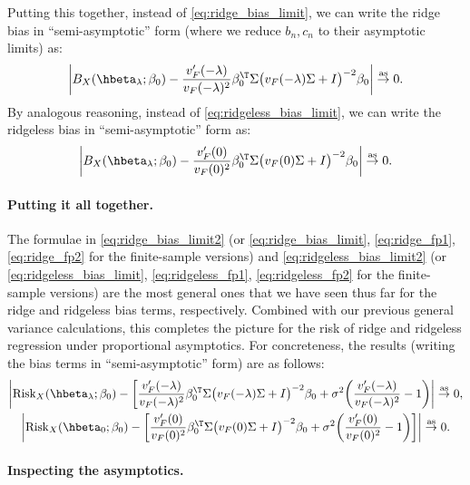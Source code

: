 \documentclass{article}
\begin{document}
Putting this together, instead of \eqref{eq:ridge_bias_limit}, we can write the 
ridge bias in ``semi-asymptotic'' form (where we reduce $b_n,c_n$ to their 
asymptotic limits) as:     
\begin{equation}
\label{eq:ridge_bias_limit2}
\bigg| B_X(\hbeta_\lambda; \beta_0) - \frac{v'_F(-\lambda)}{v_F(-\lambda)^2}
\beta_0^\T \Sigma \big( v_F(-\lambda) \Sigma + I \big)^{-2} \beta_0 \bigg| \asto
0.
\end{equation}
By analogous reasoning, instead of \eqref{eq:ridgeless_bias_limit}, we can write
the ridgeless bias in ``semi-asymptotic'' form as:
\begin{equation}
\label{eq:ridgeless_bias_limit2}
\bigg| B_X(\hbeta_\lambda; \beta_0) - \frac{v'_F(0)}{v_F(0)^2} \beta_0^\T
\Sigma \big( v_F(0) \Sigma + I \big)^{-2} \beta_0 \bigg| \asto 0.
\end{equation}

\paragraph{Putting it all together.} 

The formulae in \eqref{eq:ridge_bias_limit2} (or \eqref{eq:ridge_bias_limit},
\eqref{eq:ridge_fp1}, \eqref{eq:ridge_fp2} for the finite-sample versions) and 
\eqref{eq:ridgeless_bias_limit2} (or \eqref{eq:ridgeless_bias_limit},
\eqref{eq:ridgeless_fp1}, \eqref{eq:ridgeless_fp2} for the finite-sample
versions) are the most general ones that we have seen thus far for the ridge and
ridgeless bias terms, respectively. Combined with our previous general variance
calculations, this completes the picture for the risk of ridge and ridgeless
regression under proportional asymptotics. For concreteness, the results
(writing the bias terms in ``semi-asymptotic'' form) are as follows:
\begin{gather}
\label{eq:ridge_risk_limit2}
\bigg| \Risk_X(\hbeta_\lambda; \beta_0) - \bigg[
\frac{v'_F(-\lambda)}{v_F(-\lambda)^2} \beta_0^\T \Sigma \big( v_F(-\lambda)
\Sigma + I \big)^{-2} \beta_0 + \sigma^2 \bigg(
\frac{v'_F(-\lambda)}{v_F(-\lambda)^2} - 1 \bigg) \bigg|  \asto 0, \\     
\label{eq:ridgeless_risk_limit2}
\bigg| \Risk_X(\hbeta_0; \beta_0) - \bigg[ \frac{v'_F(0)}{v_F(0)^2} \beta_0^\T
\Sigma \big( v_F(0) \Sigma + I \big)^{-2} \beta_0 + \sigma^2 \bigg(
\frac{v'_F(0)}{v_F(0)^2} - 1 \bigg) \bigg] \bigg| \asto 0.
\end{gather}

\paragraph{Inspecting the asymptotics.}
\end{document}
